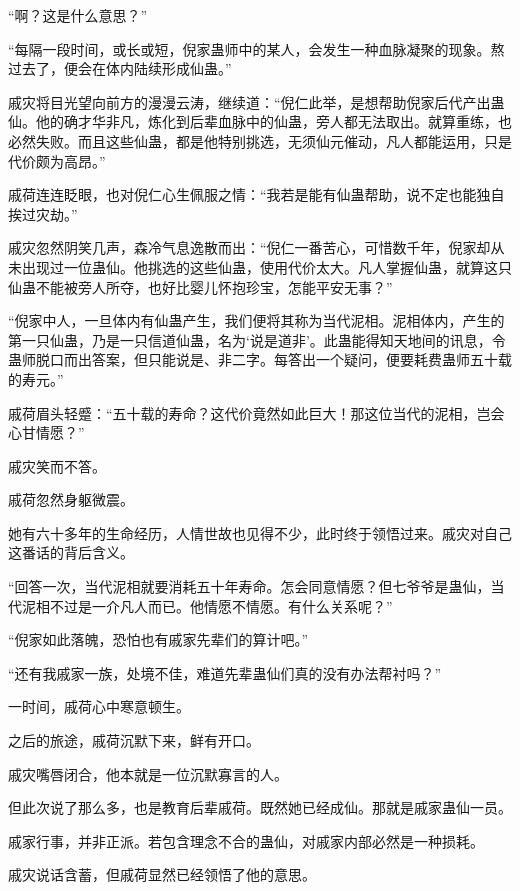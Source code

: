 
\begin{this_body}



“啊？这是什么意思？”

“每隔一段时间，或长或短，倪家蛊师中的某人，会发生一种血脉凝聚的现象。熬过去了，便会在体内陆续形成仙蛊。”

戚灾将目光望向前方的漫漫云涛，继续道：“倪仁此举，是想帮助倪家后代产出蛊仙。他的确才华非凡，炼化到后辈血脉中的仙蛊，旁人都无法取出。就算重练，也必然失败。而且这些仙蛊，都是他特别挑选，无须仙元催动，凡人都能运用，只是代价颇为高昂。”

戚荷连连眨眼，也对倪仁心生佩服之情：“我若是能有仙蛊帮助，说不定也能独自挨过灾劫。”

戚灾忽然阴笑几声，森冷气息逸散而出：“倪仁一番苦心，可惜数千年，倪家却从未出现过一位蛊仙。他挑选的这些仙蛊，使用代价太大。凡人掌握仙蛊，就算这只仙蛊不能被旁人所夺，也好比婴儿怀抱珍宝，怎能平安无事？”

“倪家中人，一旦体内有仙蛊产生，我们便将其称为当代泥相。泥相体内，产生的第一只仙蛊，乃是一只信道仙蛊，名为‘说是道非’。此蛊能得知天地间的讯息，令蛊师脱口而出答案，但只能说是、非二字。每答出一个疑问，便要耗费蛊师五十载的寿元。”

戚荷眉头轻蹙：“五十载的寿命？这代价竟然如此巨大！那这位当代的泥相，岂会心甘情愿？”

戚灾笑而不答。

戚荷忽然身躯微震。

她有六十多年的生命经历，人情世故也见得不少，此时终于领悟过来。戚灾对自己这番话的背后含义。

“回答一次，当代泥相就要消耗五十年寿命。怎会同意情愿？但七爷爷是蛊仙，当代泥相不过是一介凡人而已。他情愿不情愿。有什么关系呢？”

“倪家如此落魄，恐怕也有戚家先辈们的算计吧。”

“还有我戚家一族，处境不佳，难道先辈蛊仙们真的没有办法帮衬吗？”

一时间，戚荷心中寒意顿生。

之后的旅途，戚荷沉默下来，鲜有开口。

戚灾嘴唇闭合，他本就是一位沉默寡言的人。

但此次说了那么多，也是教育后辈戚荷。既然她已经成仙。那就是戚家蛊仙一员。

戚家行事，并非正派。若包含理念不合的蛊仙，对戚家内部必然是一种损耗。

戚灾说话含蓄，但戚荷显然已经领悟了他的意思。


\end{this_body}

